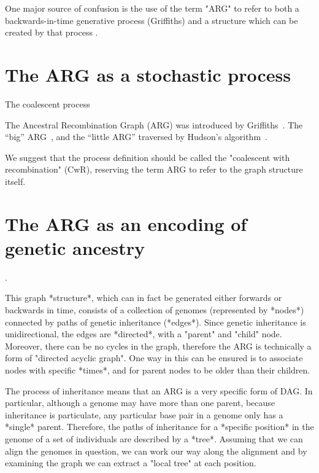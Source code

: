 \documentclass{article}
\begin{document}
One major source of confusion is the use of the term "ARG" to refer to both a backwards-in-time
generative process (Griffiths) and a structure which can be created by that process \citep[e.g.][]{minichiello2006mapping,mathieson2020ancestry}. 

\section*{The ARG as a stochastic process}
The coalescent
process~\citep{kingman1982coalescent,kingman1982genealogy,hudson1983testing,
tajima1983evolutionary}

The Ancestral Recombination Graph (ARG) was introduced by
Griffiths~\citep{griffiths1991two,griffiths1997ancestral}.
The ``big'' ARG~\citep{ethier1990two},
and the ``little ARG'' traversed by
Hudson's algorithm~\citep{hudson1983properties}.

We suggest that the process definition should be called the "coalescent with recombination" (CwR), reserving the term ARG to refer to the graph structure itself.

\section*{The ARG as an encoding of genetic ancestry}

\citep[e.g.][]{minichiello2006mapping,mathieson2020ancestry}.


This graph *structure*, which can in fact be generated either forwards or backwards in time,
consists of a collection of genomes (represented by *nodes*) connected by paths of genetic
inheritance (*edges*). Since genetic inheritance is unidirectional, the edges are *directed*,
with a "parent" and "child" node. Moreover, there can be no cycles in the graph, therefore the
ARG is technically a form of "directed acyclic graph". One way in this can be ensured is to
associate nodes with specific *times*, and for parent nodes to be older than their children.


The process of inheritance means that an ARG is a very specific form of DAG. In particular,
although a genome may have more than one parent, because inheritance is particulate,
any particular base pair in a genome only has a *single* parent. Therefore, the paths of
inheritance for a *specific position* in the genome of a set of individuals are described by
a *tree*. Assuming that we can align the genomes in question, we can work our way along
the alignment and by examining the graph we can extract a "local tree" at each position.
\end{document}
